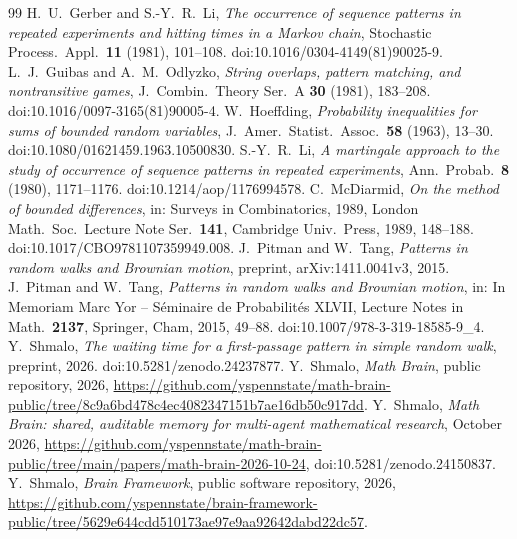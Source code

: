 \documentclass[11pt]{amsart}
\theoremstyle{remark}
\numberwithin{equation}{section}
\begin{document}
\begin{thebibliography}{99}
 H.~U.~Gerber and S.-Y.~R.~Li, \emph{The occurrence of sequence patterns in repeated experiments and hitting times in a Markov chain}, Stochastic Process.\ Appl.\ \textbf{11} (1981), 101--108. doi:10.1016/0304-4149(81)90025-9.
 L.~J.~Guibas and A.~M.~Odlyzko, \emph{String overlaps, pattern matching, and nontransitive games}, J.\ Combin.\ Theory Ser.\ A \textbf{30} (1981), 183--208. doi:10.1016/0097-3165(81)90005-4.
 W.~Hoeffding, \emph{Probability inequalities for sums of bounded random variables}, J.\ Amer.\ Statist.\ Assoc.\ \textbf{58} (1963), 13--30. doi:10.1080/01621459.1963.10500830.
 S.-Y.~R.~Li, \emph{A martingale approach to the study of occurrence of sequence patterns in repeated experiments}, Ann.\ Probab.\ \textbf{8} (1980), 1171--1176. doi:10.1214/aop/1176994578.
 C.~McDiarmid, \emph{On the method of bounded differences}, in: Surveys in Combinatorics, 1989, London Math.\ Soc.\ Lecture Note Ser.\ \textbf{141}, Cambridge Univ.\ Press, 1989, 148--188. doi:10.1017/CBO9781107359949.008.
 J.~Pitman and W.~Tang, \emph{Patterns in random walks and Brownian motion}, preprint, arXiv:1411.0041v3, 2015.
 J.~Pitman and W.~Tang, \emph{Patterns in random walks and Brownian motion}, in: In Memoriam Marc Yor -- S\'eminaire de Probabilit\'es XLVII, Lecture Notes in Math.\ \textbf{2137}, Springer, Cham, 2015, 49--88. doi:10.1007/978-3-319-18585-9\_4.
 Y.~Shmalo, \emph{The waiting time for a first-passage pattern in simple random walk}, preprint, 2026. doi:10.5281/zenodo.24237877.
 Y.~Shmalo, \emph{Math Brain}, public repository, 2026, \url{https://github.com/yspennstate/math-brain-public/tree/8c9a6bd478c4ec4082347151b7ae16db50c917dd}.
 Y.~Shmalo, \emph{Math Brain: shared, auditable memory for multi-agent mathematical research}, October 2026, \url{https://github.com/yspennstate/math-brain-public/tree/main/papers/math-brain-2026-10-24}, doi:10.5281/zenodo.24150837.
 Y.~Shmalo, \emph{Brain Framework}, public software repository, 2026, \url{https://github.com/yspennstate/brain-framework-public/tree/5629e644cdd510173ae97e9aa92642dabd22dc57}.
\end{thebibliography}
\end{document}
